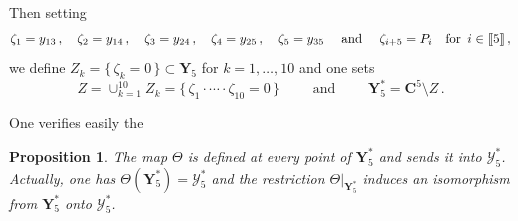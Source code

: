 \documentclass[11pt]{amsart}
\newtheorem{prop}[thm]{Proposition}
\begin{document}
Then setting  
\begin{equation}
\label{Eq:zeta-i}
\zeta_1=y_{13}
\,, \quad 
\zeta_2=y_{14}
\,, \quad
\zeta_3=y_{24}
\,, \quad
\zeta_4=y_{25}\,, \quad
\zeta_5=y_{35} 
\quad \mbox{ and } \quad 
\zeta_{i+5}=P_{i} \quad \mbox{for }\, 
i \in [\hspace{-0.05cm}[5 
]\hspace{-0.05cm}]\, , 
\end{equation}
we define 
$ Z_k=\big\{ \,\zeta_k=0\,\big\}\subset \boldsymbol{Y}_5$ for $k=1,\ldots,10$ and one sets
\begin{equation}
\label{Eq:Def-Z}
Z=\cup_{k=1}^{10} Z_k= \Big\{ \,\zeta_1\cdot \cdots \cdot \zeta_{10}=0\,\Big\}
\qquad \mbox{ and } \qquad \boldsymbol{Y}_5^*=\mathbf C^5\setminus Z\, .
\end{equation}%

One verifies easily the 
\begin{prop}
\label{Prop:Map-Theta}
The map $\Theta$ is defined at every point of $\boldsymbol{Y}_5^*$ and 
sends it into $\boldsymbol{\mathcal Y}_5^*$. Actually, one has 
$\Theta(\boldsymbol{Y}_5^*)= \boldsymbol{\mathcal Y}_5^*$ and 
 the restriction $\Theta\lvert_{\boldsymbol{Y}_5^*}$ induces an isomorphism from $\boldsymbol{Y}_5^*$ onto 
$\boldsymbol{\mathcal Y}_5^*$.
\end{prop}%
%
%
%
%
%
% 
% 
\end{document}
